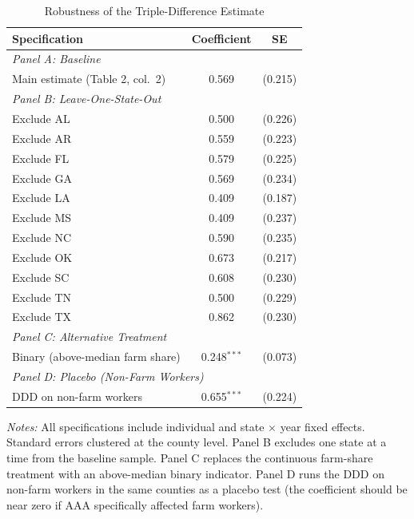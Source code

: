 \begin{table}[H]
\centering
\caption{Robustness of the Triple-Difference Estimate}
\label{tab:robustness}
\begin{threeparttable}
\begin{tabular}{lcc}
\toprule
Specification & Coefficient & SE \\
\midrule
\multicolumn{3}{l}{\textit{Panel A: Baseline}} \\
Main estimate (Table 2, col.\ 2) & 0.569 & (0.215) \\
\midrule
\multicolumn{3}{l}{\textit{Panel B: Leave-One-State-Out}} \\
Exclude AL & 0.500 & (0.226) \\
Exclude AR & 0.559 & (0.223) \\
Exclude FL & 0.579 & (0.225) \\
Exclude GA & 0.569 & (0.234) \\
Exclude LA & 0.409 & (0.187) \\
Exclude MS & 0.409 & (0.237) \\
Exclude NC & 0.590 & (0.235) \\
Exclude OK & 0.673 & (0.217) \\
Exclude SC & 0.608 & (0.230) \\
Exclude TN & 0.500 & (0.229) \\
Exclude TX & 0.862 & (0.230) \\
\midrule
\multicolumn{3}{l}{\textit{Panel C: Alternative Treatment}} \\
Binary (above-median farm share) & 0.248$^{***}$ & (0.073) \\
\midrule
\multicolumn{3}{l}{\textit{Panel D: Placebo (Non-Farm Workers)}} \\
DDD on non-farm workers & 0.655$^{***}$ & (0.224) \\
\bottomrule
\end{tabular}
\begin{tablenotes}[flushleft]
\small
\item \textit{Notes:} All specifications include individual and state $\times$ year fixed effects. Standard errors clustered at the county level. Panel B excludes one state at a time from the baseline sample. Panel C replaces the continuous farm-share treatment with an above-median binary indicator. Panel D runs the DDD on non-farm workers in the same counties as a placebo test (the coefficient should be near zero if AAA specifically affected farm workers).
\end{tablenotes}
\end{threeparttable}
\end{table}

